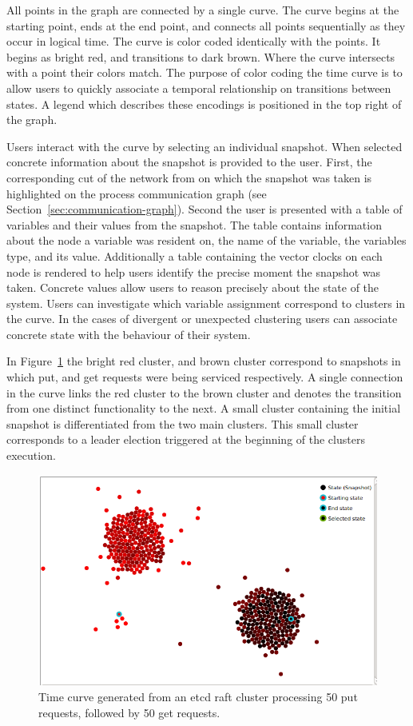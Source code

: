 All points in the graph are connected by a single curve. The curve
begins at the starting point, ends at the end point, and connects all
points sequentially as they occur in logical time. The curve is color
coded identically with the points. It begins as bright red, and
transitions to dark brown. Where the curve intersects with a point
their colors match. The purpose of color coding the time curve is to
allow users to quickly associate a temporal relationship on
transitions between states. A legend which describes these encodings
is positioned in the top right of the graph.

Users interact with the curve by selecting an individual snapshot.
When selected concrete information about the snapshot is provided to
the user. First, the corresponding cut of the network from on which
the snapshot was taken is highlighted on the process communication
graph (see Section~\ref{sec:communication-graph}). Second the user is
presented with a table of variables and their values from the
snapshot. The table contains information about the node a variable was
resident on, the name of the variable, the variables type, and its
value. Additionally a table containing the vector clocks on each node
is rendered to help users identify the precise moment the snapshot was
taken. Concrete values allow users to reason precisely about the state
of the system. Users can investigate which variable assignment
correspond to clusters in the curve. In the cases of divergent or
unexpected clustering users can associate concrete state with the
behaviour of their system.

In Figure~\ref{fig:put-get-curve} the bright red cluster, and brown
cluster correspond to snapshots in which put, and get requests were
being serviced respectively. A single connection in the curve links the
red cluster to the brown cluster and denotes the transition from one
distinct functionality to the next. A small cluster containing the
initial snapshot is differentiated from the two main clusters. This
small cluster corresponds to a leader election triggered at the
beginning of the clusters execution.

\begin{figure}[h]
    \includegraphics[width=\linewidth]{fig/put-get-curve}%
    \caption{Time curve generated from an etcd raft cluster processing 50 put requests, followed by 50 get requests.\label{fig:put-get-curve}}%
\end{figure}
    


